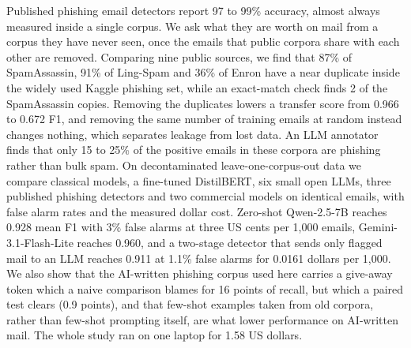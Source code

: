 Published phishing email detectors report 97 to 99\% accuracy, almost always
measured inside a single corpus. We ask what they are worth on mail from a
corpus they have never seen, once the emails that public corpora share with
each other are removed. Comparing nine public sources, we find that
87\% of SpamAssassin, 91\% of Ling-Spam and
36\% of Enron have a near duplicate inside the widely used Kaggle
phishing set, while an exact-match check finds 2 of the
SpamAssassin copies. Removing the duplicates lowers a transfer score from
0.966 to 0.672 F1, and removing the same number of
training emails at random instead changes nothing, which separates leakage from
lost data. An LLM annotator finds that only 15 to 25\% of
the positive emails in these corpora are phishing rather than bulk spam. On
decontaminated leave-one-corpus-out data we compare classical models, a
fine-tuned DistilBERT, six small open LLMs, three published phishing detectors
and two commercial models on identical emails, with false alarm rates and the
measured dollar cost. Zero-shot Qwen-2.5-7B reaches 0.928 mean F1
with 3\% false alarms at three US cents per 1{,}000 emails,
Gemini-3.1-Flash-Lite reaches 0.960, and a two-stage detector that
sends only flagged mail to an LLM reaches 0.911 at
1.1\% false alarms for 0.0161 dollars per
1{,}000. We also show that the AI-written phishing corpus used here carries a
give-away token which a naive comparison blames for 16 points of recall,
but which a paired test clears (0.9 points), and that
few-shot examples taken from old corpora, rather than few-shot prompting
itself, are what lower performance on AI-written mail. The whole study ran on
one laptop for 1.58 US dollars.